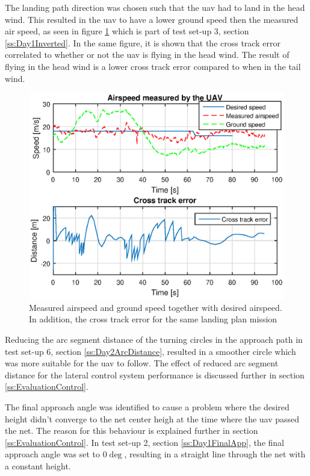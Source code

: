 The landing path direction was chosen such that the \gls{uav} had to land in the head wind. This resulted in the \gls{uav} to have a lower ground speed then the measured air speed, as seen in figure \ref{Fig:Airspeed31mai125420} which is part of test set-up 3, section \ref{ss:Day1Inverted}. In the same figure, it is shown that the cross track error correlated to whether or not the \gls{uav} is flying in the head wind. The result of flying in the head wind is a lower cross track error compared to when in the tail wind.
\newpage 
\begin{figure}[H]
\centering
\includegraphics[scale=0.9]{figs/Experiment/airspeed31mai125420.eps}
\caption{Measured airspeed and ground speed together with desired airspeed. In addition, the cross track error for the same landing plan mission}
\label{Fig:Airspeed31mai125420}
\end{figure}

Reducing the arc segment distance of the turning circles in the approach path in test set-up 6, section \ref{ss:Day2ArcDistance}, resulted in a smoother circle which  was more suitable for the \gls{uav} to follow. The effect of reduced arc segment distance for the lateral control system performance is discussed further in section \ref{ss:EvaluationControl}.

The final approach angle was identified to cause a problem where the desired height didn't converge to the net center heigh at the time where the \gls{uav} passed the net. The reason for this behaviour is explained further in section \ref{ss:EvaluationControl}. In test set-up 2, section \ref{ss:Day1FinalApp}, the final approach angle was set to $0 \deg$, resulting in a straight line through the net with a constant height.

